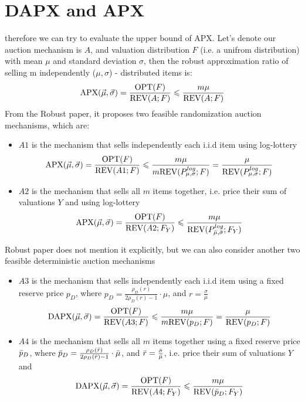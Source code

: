 \section{DAPX and APX} 
therefore we can try to evaluate the upper bound of APX. Let's denote our auction mechanism is $A$, and valuation distribution $F$ (i.e. a unifrom distribution) with mean $\mu$ and standard deviation $\sigma$, then the robust approximation ratio of selling m independently ($\mu, \sigma$) - distributed items is:
\begin{equation}\notag
    \text{APX}(\vec{\mu},\vec{\sigma}) = \frac{\text{OPT}(F)}{\text{REV}(A;F)} \leqslant \frac{m\mu}{\text{REV}(A;F)}
\end{equation}
From the Robust paper, it proposes two feasible randomization auction mechanisms, which are:
\begin{itemize}
    \item $A1$ is the mechanism that sells independently each i.i.d item using log-lottery 
    \begin{equation}\notag
        \text{APX}(\vec{\mu},\vec{\sigma}) = \frac{\text{OPT}(F)}{\text{REV}(A1;F)} \leqslant \frac{m\mu}{m\text{REV}(P^{log}_{\mu,\sigma};F)} = \frac{\mu}{\text{REV}(P^{log}_{\mu,\sigma};F)}
\end{equation}
    \item $A2$ is the mechanism that sells all $m$ items together, i.e. price their sum of valuations $Y$ and  using log-lottery 
    \begin{equation}\notag
        \text{APX}(\vec{\mu},\vec{\sigma}) = \frac{\text{OPT}(F)}{\text{REV}(A2;F_Y)} \leqslant \frac{m\mu}{\text{REV}(P^{log}_{\Bar{\mu},\Bar{\sigma}};F_Y)}
\end{equation}
\end{itemize}
Robust paper does not mention it explicitly, but we can also consider another two feasible deterministic auction mechanisms
\begin{itemize}
    \item $A3$ is the mechanism that sells independently each i.i.d item using a fixed reserve price $p_D$, where $p_D = \frac{\rho_D(r)}{2\rho_D(r) - 1} \cdot \mu$, and $r = \frac{\sigma}{\mu}$
    \begin{equation}\notag
        \text{DAPX}(\vec{\mu},\vec{\sigma}) = \frac{\text{OPT}(F)}{\text{REV}(A3;F)} \leqslant \frac{m\mu}{m\text{REV}(p_D;F)} = \frac{\mu}{\text{REV}(p_D;F)}
\end{equation}
    \item $A4$ is the mechanism that sells all $m$ items together using a fixed reserve price $\Bar{p}_D$, where $\Bar{p}_D = \frac{\rho_D(\Bar{r})}{2\rho_D(\Bar{r}) - 1} \cdot \Bar{\mu}$, and $\Bar{r} = \frac{\Bar{\sigma}}{\Bar{\mu}}$, i.e. price their sum of valuations $Y$ and 
    \begin{equation}\notag
        \text{DAPX}(\vec{\mu},\vec{\sigma}) = \frac{\text{OPT}(F)}{\text{REV}(A4;F_Y)} \leqslant \frac{m\mu}{\text{REV}(\Bar{p}_D;F_Y)}
\end{equation}
\end{itemize}

